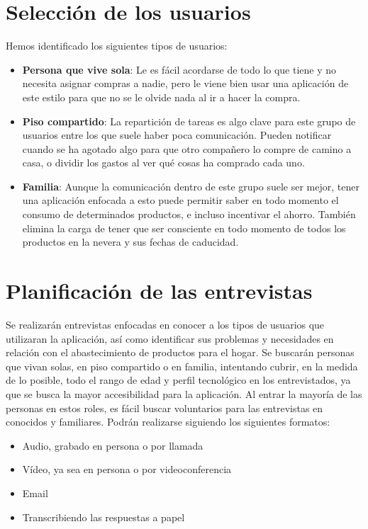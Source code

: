 \section{Selección de los usuarios}
Hemos identificado los siguientes tipos de usuarios:
\begin{itemize}
    \item \textbf{Persona que vive sola}: Le es fácil acordarse de todo lo que tiene y no necesita asignar compras a nadie, pero le viene bien usar una aplicación de este estilo para que no se le olvide nada al ir a hacer la compra.
    \item \textbf{Piso compartido}: La repartición de tareas es algo clave para este grupo de usuarios entre los que suele haber poca comunicación. Pueden notificar cuando se ha agotado algo para que otro compañero lo compre de camino a casa, o dividir los gastos al ver qué cosas ha comprado cada uno.
    \item \textbf{Familia}: Aunque la comunicación dentro de este grupo suele ser mejor, tener una aplicación enfocada a esto puede permitir saber en todo momento el consumo de determinados productos, e incluso incentivar el ahorro. También elimina la carga de tener que ser consciente en todo momento de todos los productos en la nevera y sus fechas de caducidad.
\end{itemize}

\section{Planificación de las entrevistas}
Se realizarán entrevistas enfocadas en conocer a los tipos de usuarios que utilizaran la aplicación, así como identificar sus problemas y necesidades en relación con el abastecimiento de productos para el hogar. Se buscarán personas que vivan solas, en piso compartido o en familia, intentando cubrir, en la medida de lo posible, todo el rango de edad y perfil tecnológico en los entrevistados, ya que se busca la mayor accesibilidad para la aplicación. 
Al entrar la mayoría de las personas en estos roles, es fácil buscar voluntarios para las entrevistas en conocidos y familiares.
Podrán realizarse siguiendo los siguientes formatos:
\begin{itemize}
    \item Audio, grabado en persona o por llamada
    \item Vídeo, ya sea en persona o por videoconferencia
    \item Email
    \item Transcribiendo las respuestas a papel
\end{itemize}

